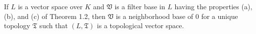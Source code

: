 If $L$ is a vector space over $K$ and $\mathfrak{V}$ is a filter base in $L$ having the properties (a), (b), and (c) of Theorem 1.2, then $\mathfrak{V}$ is a neighborhood base of 0 for a unique topology $\mathfrak{T}$ such that $(L, \mathfrak{T})$ is a topological vector space.
